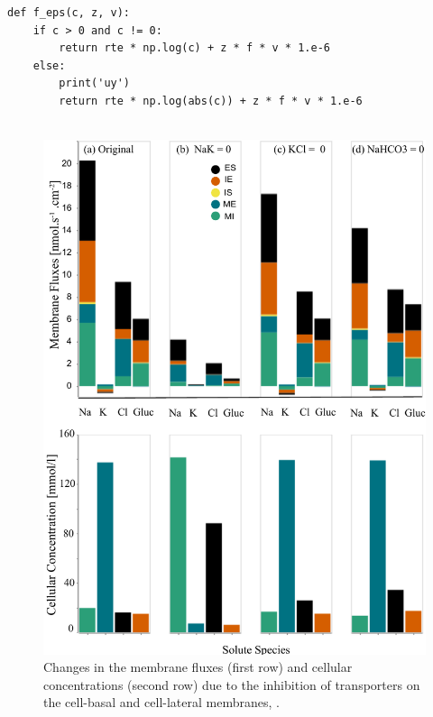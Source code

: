 \documentclass[fleqn,10pt]{physiome}
\begin{document}
\begin{verbatim}
def f_eps(c, z, v):    
    if c > 0 and c != 0: 
        return rte * np.log(c) + z * f * v * 1.e-6
    else:
        print('uy')
        return rte * np.log(abs(c)) + z * f * v * 1.e-6
   
\end{verbatim}
\newpage
\begin{figure}[h!]
\includegraphics[width=1\linewidth]{Figure6.pdf}
\centering
\caption{Changes in the membrane fluxes (first row) and cellular concentrations (second row) due to the inhibition of transporters on the cell-basal and cell-lateral membranes, \cite[Figure 6]{noroozbabaee2022modular}.}
\label{fig:Figure6}
\end{figure}
\end{document}
